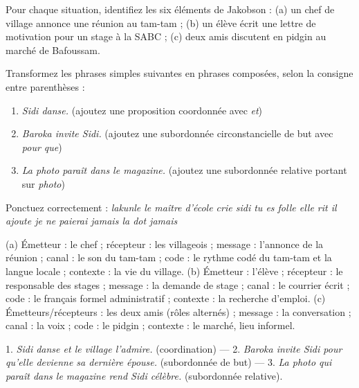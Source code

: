 \documentclass[11pt]{article}
\newcounter{popsec}
\newcounter{popsub}
\newcommand{\courssub}[1]{%
  \stepcounter{popsub}%
  \par\vspace{9pt}\noindent{\popxbold\fontsize{11.5}{13}\selectfont\color{popink}{\color{poporange}\thepopsec.\thepopsub}\hspace{6pt}#1}\par\nopagebreak\vspace{4pt}
}
\begin{document}
\courssub{Exercices d'application}

\begin{exercice}
Pour chaque situation, identifiez les six éléments de Jakobson : (a) un chef de village annonce une réunion au tam-tam ; (b) un élève écrit une lettre de motivation pour un stage à la SABC ; (c) deux amis discutent en pidgin au marché de Bafoussam.
\end{exercice}

\begin{exercice}
Transformez les phrases simples suivantes en phrases composées, selon la consigne entre parenthèses :
\begin{enumerate}
\item \emph{Sidi danse.} (ajoutez une proposition coordonnée avec \emph{et})
\item \emph{Baroka invite Sidi.} (ajoutez une subordonnée circonstancielle de but avec \emph{pour que})
\item \emph{La photo paraît dans le magazine.} (ajoutez une subordonnée relative portant sur \emph{photo})
\end{enumerate}
\end{exercice}

\begin{exercice}
Ponctuez correctement : \emph{lakunle le maître d'école crie sidi tu es folle elle rit il ajoute je ne paierai jamais la dot jamais}
\end{exercice}

\begin{corrige}[Exercice 1]
(a) Émetteur : le chef ; récepteur : les villageois ; message : l'annonce de la réunion ; canal : le son du tam-tam ; code : le rythme codé du tam-tam et la langue locale ; contexte : la vie du village. (b) Émetteur : l'élève ; récepteur : le responsable des stages ; message : la demande de stage ; canal : le courrier écrit ; code : le français formel administratif ; contexte : la recherche d'emploi. (c) Émetteurs/récepteurs : les deux amis (rôles alternés) ; message : la conversation ; canal : la voix ; code : le pidgin ; contexte : le marché, lieu informel.
\end{corrige}

\begin{corrige}[Exercice 2]
1. \emph{Sidi danse et le village l'admire.} (coordination) — 2. \emph{Baroka invite Sidi pour qu'elle devienne sa dernière épouse.} (subordonnée de but) — 3. \emph{La photo qui paraît dans le magazine rend Sidi célèbre.} (subordonnée relative).
\end{corrige}
\end{document}
